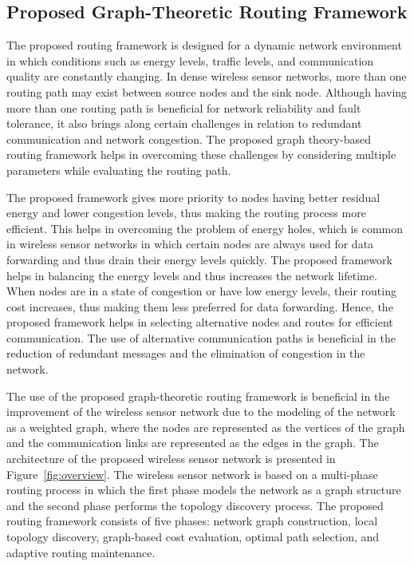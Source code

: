 \documentclass[a4paper,fleqn]{cas-dc}
\numberwithin{equation}{section}
\begin{document}
\subsection{Proposed Graph-Theoretic Routing Framework}

The proposed routing framework is designed for a dynamic network environment in which conditions such as energy levels, traffic levels, and communication quality are constantly changing. In dense wireless sensor networks, more than one routing path may exist between source nodes and the sink node. Although having more than one routing path is beneficial for network reliability and fault tolerance, it also brings along certain challenges in relation to redundant communication and network congestion. The proposed graph theory-based routing framework helps in overcoming these challenges by considering multiple parameters while evaluating the routing path.

The proposed framework gives more priority to nodes having better residual energy and lower congestion levels, thus making the routing process more efficient. This helps in overcoming the problem of energy holes, which is common in wireless sensor networks in which certain nodes are always used for data forwarding and thus drain their energy levels quickly. The proposed framework helps in balancing the energy levels and thus increases the network lifetime. When nodes are in a state of congestion or have low energy levels, their routing cost increases, thus making them less preferred for data forwarding. Hence, the proposed framework helps in selecting alternative nodes and routes for efficient communication. The use of alternative communication paths is beneficial in the reduction of redundant messages and the elimination of congestion in the network.

The use of the proposed graph-theoretic routing framework is beneficial in the improvement of the wireless sensor network due to the modeling of the network as a weighted graph, where the nodes are represented as the vertices of the graph and the communication links are represented as the edges in the graph. The architecture of the proposed wireless sensor network is presented in Figure~\ref{fig:overview}. The wireless sensor network is based on a multi-phase routing process in which the first phase models the network as a graph structure and the second phase performs the topology discovery process. The proposed routing framework consists of five phases: network graph construction, local topology discovery, graph-based cost evaluation, optimal path selection, and adaptive routing maintenance.
\end{document}

